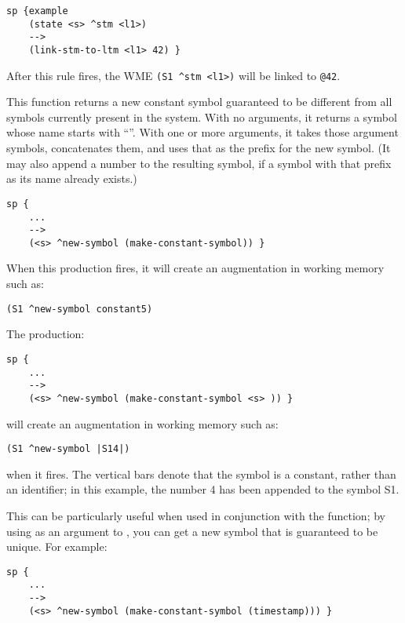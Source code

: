 \begin{description}
\begin{verbatim}
sp {example
    (state <s> ^stm <l1>)
    -->
    (link-stm-to-ltm <l1> 42) }
\end{verbatim}

After this rule fires, the WME \verb=(S1 ^stm <l1>)= will be linked to \verb=@42=.


\item [\soarb{make-constant-symbol} --- ] This function returns a new constant 
symbol
guaranteed to be different from all symbols currently present in the
system.  With no arguments, it returns a symbol whose name starts with
``''.  With one or more arguments, it takes those
argument symbols, concatenates them, and uses that as the
prefix for the new symbol. (It may also append a number to the 
resulting symbol, 
if a symbol with that prefix as its name already exists.)

\begin{verbatim}
sp {
    ...
    -->
    (<s> ^new-symbol (make-constant-symbol)) }
\end{verbatim}

When this production fires, it will create an augmentation in working
memory such as:

\begin{verbatim}
(S1 ^new-symbol constant5)
\end{verbatim} \vspace{12pt}

The production:

\begin{verbatim}
sp {
    ...
    -->
    (<s> ^new-symbol (make-constant-symbol <s> )) }
\end{verbatim}

will create an augmentation in working memory such as:
\begin{verbatim}
(S1 ^new-symbol |S14|)
\end{verbatim}

when it fires. The vertical bars denote that the symbol is a
constant, rather than an identifier; in this example, the number 4 has
been appended to the symbol S1.

This can be particularly useful when used in conjunction with the
 function; by using  as an argument to
, you can get a new symbol that is
guaranteed to be unique. For example:

\begin{verbatim}
sp {
    ...
    -->
    (<s> ^new-symbol (make-constant-symbol (timestamp))) }
\end{verbatim}


\end{description}
